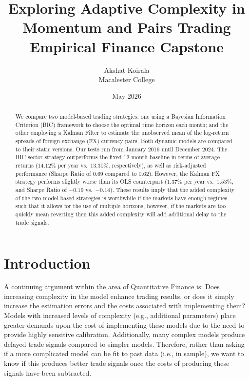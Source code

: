 \documentclass[12pt]{article}
\title{\textbf{Exploring Adaptive Complexity in Momentum and Pairs Trading}\\[0.4em]
\large Empirical Finance Capstone}
\author{Akshat Koirala\\Macalester College}
\date{May 2026}
\begin{document}
\maketitle

\begin{abstract}
We compare two model-based trading strategies: one using a Bayesian Information Criterion (BIC) framework to choose the optimal time horizon each month; and the other employing a Kalman Filter to estimate the unobserved mean of the log-return spreads of foreign exchange (FX) currency pairs. Both dynamic models are compared to their static versions. Our tests run from January 2016 until December 2024. The BIC sector strategy outperforms the fixed 12-month baseline in terms of average returns ($14.12\%$ per year vs.\ $13.30\%$, respectively), as well as risk-adjusted performance (Sharpe Ratio of $0.69$ compared to $0.62$). However, the Kalman FX strategy performs slightly worse than its OLS counterpart ($1.37\%$ per year vs.\ $1.53\%$, and Sharpe Ratio of $-0.19$ vs.\ $-0.14$). These results imply that the added complexity of the two model-based strategies is worthwhile if the markets have enough regimes such that it allows for the use of multiple horizons, however, if the markets are too quickly mean reverting then this added complexity will add additional delay to the trade signals.
\end{abstract}

\newpage

\begingroup
\singlespacing
\small
\setlength{\parskip}{0pt}
\tableofcontents
\endgroup

\newpage
\onehalfspacing

\section{Introduction}

A continuing argument within the area of Quantitative Finance is: Does increasing complexity in the model enhance trading results, or does it simply increase the estimation errors and the costs associated with implementing them? Models with increased levels of complexity (e.g., additional parameters) place greater demands upon the cost of implementing these models due to the need to provide highly sensitive calibration. Additionally, many complex models produce delayed trade signals compared to simpler models. Therefore, rather than asking if a more complicated model can be fit to past data (i.e., in sample), we want to know if this produces better trade signals once the costs of producing these signals have been subtracted.
\end{document}
